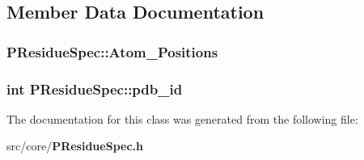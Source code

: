 \subsection{Member Data Documentation}
\subsubsection{ {\bf PResidue\-Spec::Atom\_\-Positions}}\label{classPResidueSpec_6bcacbbeed6fd0af115873e123af54e3}


\subsubsection{\setlength{\rightskip}{0pt plus 5cm}int {\bf PResidue\-Spec::pdb\_\-id}}\label{classPResidueSpec_718b13211bf60ac03637fe791d9a0087}




The documentation for this class was generated from the following file:\begin{CompactItemize}
\item 
src/core/{\bf PResidue\-Spec.h}\end{CompactItemize}
